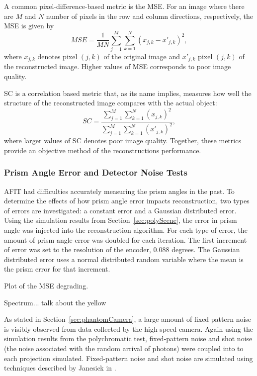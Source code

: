 A common pixel-difference-based metric is the \ac{MSE}. For an image where there are $M$ and $N$ number of pixels in the row and column directions, respectively, the \ac{MSE} is given by
\begin{equation}
\label{eq:MSE}
MSE = \frac{1}{MN} \sum_{j=1}^{M} \sum_{k=1}^{N} \left(x_{j,k}-x'_{j,k}\right)^2,
\end{equation}
where $x_{j,k}$ denotes pixel $(j,k)$ of the original image and $x'_{j,k}$ pixel $(j,k)$ of the reconstructed image. Higher values of \ac{MSE} corresponds to poor image quality. 


\ac{SC} is a correlation based metric that, as its name implies, measures how well the structure of the reconstructed image compares with the actual object:
\begin{equation}
\label{eq:SC}
SC = \frac{\sum_{j=1}^{M} \sum_{k=1}^{N} \left(x_{j,k}\right)^2}{\sum_{j=1}^{M} \sum_{k=1}^{N} \left(x'_{j,k}\right)^2},
\end{equation}
where larger values of \ac{SC} denotes poor image quality. Together, these metrics provide an objective method of the reconstructions performance. 

\subsubsection{Prism Angle Error and Detector Noise Tests}

\ac{AFIT} had difficulties accurately measuring the prism angles in the past. To determine the effects of how prism angle error impacts reconstruction, two types of errors are investigated:  a constant error and a Gaussian distributed error. Using the simulation results from Section~\ref{sec:polyScene}, the error in prism angle was injected into the reconstruction algorithm. For each type of error, the amount of prism angle error was doubled for each iteration. The first increment of error was set to the resolution of the encoder, 0.088 degrees. The Gaussian distributed error uses a normal distributed random variable where the mean is the prism error for that increment. 


Plot of the MSE degrading. 

Spectrum... talk about the yellow




As stated in Section~\ref{sec:phantomCamera}, a large amount of fixed pattern noise is visibly observed from data collected by the high-speed camera. Again using the simulation results from the polychromatic test, fixed-pattern noise and shot noise (the noise associated with the random arrival of photons) were coupled into to each projection simulated. Fixed-pattern noise and shot noise are simulated using techniques described by Janesick in \cite{Janesick}. 

